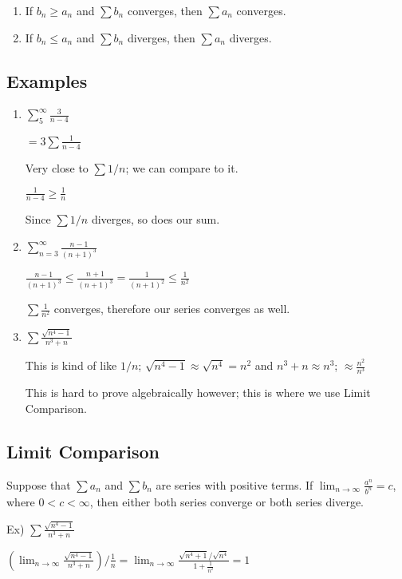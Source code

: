 \documentclass{article}
\begin{document}
\begin{enumerate}
    \item If $b_n \geq a_n$ and $\sum b_n$ converges, then $\sum a_n$ converges.
    \item If $b_n \leq a_n$ and $\sum b_n$ diverges, then $\sum a_n$ diverges.
\end{enumerate}


\subsection{Examples}

\begin{enumerate}
    \item $\sum_5^\infty \frac{3}{n-4}$
    
    $=3\sum \frac{1}{n-4}$ 
    
    Very close to $\sum 1/n$; we can compare to it.
    
    $\frac{1}{n-4} \geq \frac{1}{n}$
    
    Since $\sum 1/n$ diverges, so does our sum.
    
    \item $\sum_{n=3}^\infty \frac{n-1}{(n+1)^3}$
    
    $\frac{n-1}{(n+1)^3} \leq \frac{n+1}{(n+1)^3} = \frac{1}{(n+1)^2} \leq \frac{1}{n^2}$
    
    $\sum \frac{1}{n^2}$ converges, therefore our series converges as well.
    
    \item $\sum \frac{\sqrt{n^4-1}}{n^3+n}$
    
    This is kind of like $1/n$; $\sqrt{n^4-1} \approx \sqrt{n^4} = n^2$ and $n^3+n \approx n^3$; $\approx \frac{n^2}{n^3}$
    
    This is hard to prove algebraically however; this is where we use Limit Comparison.
\end{enumerate}

\subsection{Limit Comparison}

Suppose that $\sum a_n$ and $\sum b_n$ are series with positive terms. If $\lim_{n\to\infty} \frac{a^n}{b^n} = c$, where $0<c<\infty$, then either both series converge or both series diverge.

Ex) $\sum \frac{\sqrt{n^4-1}}{n^3+n}$

$(\lim_{n\to\infty} \frac{\sqrt{n^4-1}}{n^3+n})/\frac{1}{n}= \lim_{n\to\infty} \frac{\sqrt{n^4+1}/\sqrt{n^4}}{1+\frac{1}{n^2}} = 1$
\end{document}
